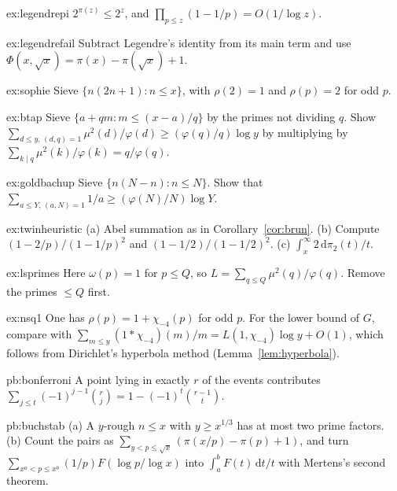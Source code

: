 \begin{hint}{ex:legendrepi}
$2^{\pi(z)}\le2^z$, and $\prod_{p\le z}(1-1/p)=O(1/\log z)$.
\end{hint}
\begin{hint}{ex:legendrefail}
Subtract Legendre's identity from its main term and use $\Phi(x,\sqrt x)=\pi(x)-\pi(\sqrt x)+1$.
\end{hint}
\begin{hint}{ex:sophie}
Sieve $\{n(2n+1):n\le x\}$, with $\rho(2)=1$ and $\rho(p)=2$ for odd $p$.
\end{hint}
\begin{hint}{ex:btap}
Sieve $\{a+qm:m\le(x-a)/q\}$ by the primes not dividing $q$. Show $\sum_{d\le y,\,(d,q)=1}\mu^2(d)/\varphi(d)\ge(\varphi(q)/q)\log y$ by multiplying by $\sum_{k\mid q}\mu^2(k)/\varphi(k)=q/\varphi(q)$.
\end{hint}
\begin{hint}{ex:goldbachup}
Sieve $\{n(N-n):n\le N\}$. Show that $\sum_{a\le Y,\,(a,N)=1}1/a\ge(\varphi(N)/N)\log Y$.
\end{hint}
\begin{hint}{ex:twinheuristic}
(a) Abel summation as in Corollary~\ref{cor:brun}. (b) Compute $(1-2/p)/(1-1/p)^2$ and $(1-1/2)/(1-1/2)^2$. (c) $\int_x^\infty 2\,\mathrm d\pi_2(t)/t$.
\end{hint}
\begin{hint}{ex:lsprimes}
Here $\omega(p)=1$ for $p\le Q$, so $L=\sum_{q\le Q}\mu^2(q)/\varphi(q)$. Remove the primes $\le Q$ first.
\end{hint}
\begin{hint}{ex:nsq1}
One has $\rho(p)=1+\chi_{-4}(p)$ for odd $p$. For the lower bound of $G$, compare with $\sum_{m\le y}(1*\chi_{-4})(m)/m=L(1,\chi_{-4})\log y+O(1)$, which follows from Dirichlet's hyperbola method (Lemma~\ref{lem:hyperbola}).
\end{hint}

\begin{hint}{pb:bonferroni}
A point lying in exactly $r$ of the events contributes $\sum_{j\le t}(-1)^{j-1}\binom rj=1-(-1)^t\binom{r-1}t$.
\end{hint}

\begin{hint}{pb:buchstab}
(a) A $y$-rough $n\le x$ with $y\ge x^{1/3}$ has at most two prime factors. (b) Count the pairs as $\sum_{y<p\le\sqrt x}(\pi(x/p)-\pi(p)+1)$, and turn $\sum_{x^a<p\le x^b}(1/p)F(\log p/\log x)$ into $\int_a^b F(t)\,\mathrm dt/t$ with Mertens's second theorem.
\end{hint}

